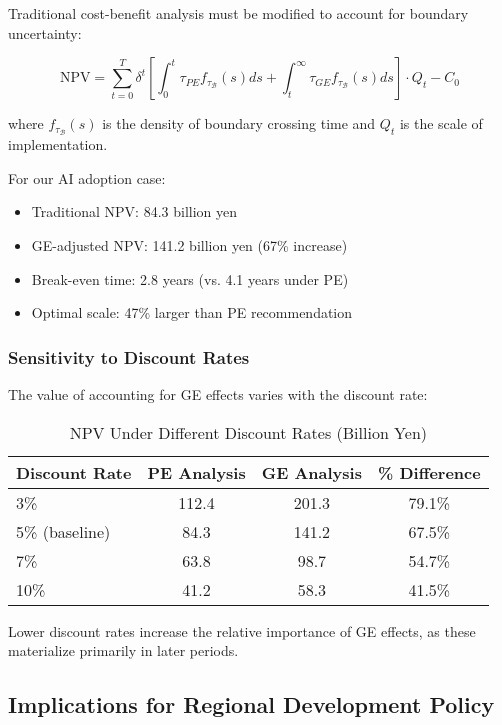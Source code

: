 Traditional cost-benefit analysis must be modified to account for boundary uncertainty:

\begin{equation}
\text{NPV} = \sum_{t=0}^T \delta^t \left[\int_0^t \tau_{PE} f_{\tau_\mathcal{B}}(s) ds + \int_t^\infty \tau_{GE} f_{\tau_\mathcal{B}}(s) ds\right] \cdot Q_t - C_0
\end{equation}

where $f_{\tau_\mathcal{B}}(s)$ is the density of boundary crossing time and $Q_t$ is the scale of implementation.

For our AI adoption case:
\begin{itemize}
   \item Traditional NPV: 84.3 billion yen
   \item GE-adjusted NPV: 141.2 billion yen (67\% increase)
   \item Break-even time: 2.8 years (vs. 4.1 years under PE)
   \item Optimal scale: 47\% larger than PE recommendation
\end{itemize}

\subsubsection{Sensitivity to Discount Rates}

The value of accounting for GE effects varies with the discount rate:

\begin{table}[H]
\centering
\caption{NPV Under Different Discount Rates (Billion Yen)}
\label{tab:npv_sensitivity}
\begin{tabular}{lccc}
\toprule
Discount Rate & PE Analysis & GE Analysis & \% Difference \\
\midrule
3\% & 112.4 & 201.3 & 79.1\% \\
5\% (baseline) & 84.3 & 141.2 & 67.5\% \\
7\% & 63.8 & 98.7 & 54.7\% \\
10\% & 41.2 & 58.3 & 41.5\% \\
\bottomrule
\end{tabular}
\end{table}

Lower discount rates increase the relative importance of GE effects, as these materialize primarily in later periods.

\subsection{Implications for Regional Development Policy}

